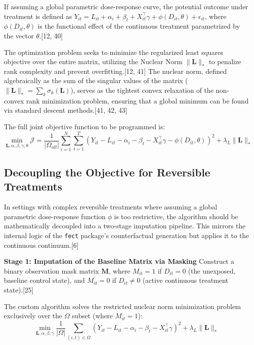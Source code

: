 \documentclass{article}
\begin{document}
If assuming a global parametric dose-response curve, the potential outcome under treatment is defined as $Y_{it} = L_{it} + \alpha_i + \beta_t + X_{it}^\top \gamma + \phi(D_{it}, \theta) + \epsilon_{it}$, where $\phi(D_{it}, \theta)$ is the functional effect of the continuous treatment parametrized by the vector $\theta$.[12, 40]

The optimization problem seeks to minimize the regularized least squares objective over the entire matrix, utilizing the Nuclear Norm $\| \mathbf{L} \|_*$ to penalize rank complexity and prevent overfitting.[12, 41] The nuclear norm, defined algebraically as the sum of the singular values of the matrix ($\|\mathbf{L}\|_* = \sum_k \sigma_k(\mathbf{L})$), serves as the tightest convex relaxation of the non-convex rank minimization problem, ensuring that a global minimum can be found via standard descent methods.[41, 42, 43]

The full joint objective function to be programmed is:
$$\min_{\mathbf{L}, \alpha, \beta, \gamma, \theta} \mathcal{J} = \frac{1}{|\Omega_{all}|} \sum_{i=1}^N \sum_{t=1}^T \left( Y_{it} - L_{it} - \alpha_i - \beta_t - X_{it}^\top \gamma - \phi(D_{it}, \theta) \right)^2 + \lambda_L \|\mathbf{L}\|_*$$

\subsection{Decoupling the Objective for Reversible Treatments}

In settings with complex reversible treatments where assuming a global parametric dose-response function $\phi$ is too restrictive, the algorithm should be mathematically decoupled into a two-stage imputation pipeline. This mirrors the internal logic of the \texttt{fect} package's counterfactual generation but applies it to the continuous continuum.[6]

\textbf{Stage 1: Imputation of the Baseline Matrix via Masking}
Construct a binary observation mask matrix $\mathbf{M}$, where $M_{it} = 1$ if $D_{it} = 0$ (the unexposed, baseline control state), and $M_{it} = 0$ if $D_{it} \neq 0$ (active continuous treatment state).[25] 

The custom algorithm solves the restricted nuclear norm minimization problem exclusively over the $\Omega$ subset (where $M_{it} = 1$):
$$\min_{\mathbf{L}, \alpha, \beta, \gamma} \frac{1}{|\Omega|} \sum_{(i,t) \in \Omega} \left( Y_{it} - L_{it} - \alpha_i - \beta_t - X_{it}^\top \gamma \right)^2 + \lambda_L \|\mathbf{L}\|_*$$
\end{document}
